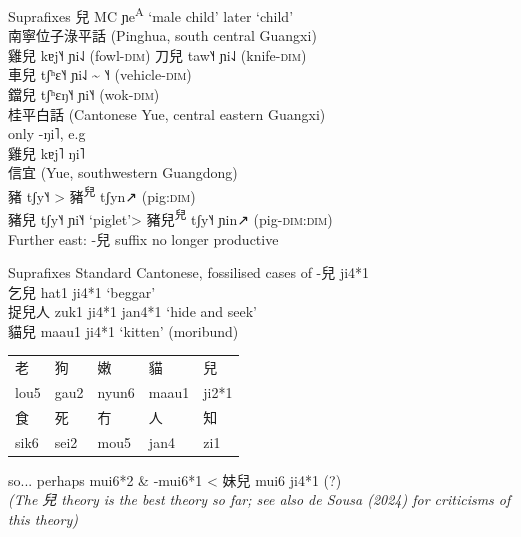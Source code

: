 \documentclass{beamer}
\begin{document}
\begin{frame}[fragile]{Suprafixes}
兒 MC ɲe\textsuperscript{A} \enquote*{male child} later \enquote*{child}\\
\bigskip
南寧位子淥平話 (Pinghua, south central Guangxi)\\
雞兒 kɐj˥˧ ɲi˨˩ (fowl-\textsc{dim})
\quad 刀兒 taw˥˧ ɲi˨˩ (knife-\textsc{dim})\\
車兒 tʃʰɛ˥˧ ɲi˨˩ \~{} ˥˧ (vehicle-\textsc{dim})\\
鐺兒 tʃʰɛŋ˥˧ ɲi˥˧ (wok-\textsc{dim})\\
\medskip
桂平白話 (Cantonese Yue, central eastern Guangxi)\\
only -ŋi˥, e.g\\
雞兒 kɐj˥ ŋi˥\\
\medskip
信宜 (Yue, southwestern Guangdong)\\
豬 tʃy˥˧ > 豬\textsuperscript{兒} tʃyn↗ (pig:\textsc{dim})\\
豬兒 tʃy˥˧ ɲi˥˧ \enquote*{piglet}> 豬兒\textsuperscript{兒} tʃy˥˧ ɲin↗ (pig-\textsc{dim}:\textsc{dim})\\
\medskip
Further east: -兒 suffix no longer productive

\end{frame}

\begin{frame}[fragile]{Suprafixes}
Standard Cantonese, fossilised cases of -兒 ji4*1\\
\medskip
乞兒 hat1 ji4*1 \enquote*{beggar}\\
捉兒人 zuk1 ji4*1 jan4*1 \enquote*{hide and seek}\\
\textcolor{gray!75}{貓兒 maau1 ji4*1 \enquote*{kitten} (moribund)}\\
\medskip
\begin{table}
    \flushleft
    \textcolor{gray!75}{
    \begin{tabular}{l l l l l}
        老 & 狗 & 嫩 & 貓 & 兒\\
        lou5 & gau2 & nyun6 & maau1 & ji2*1\\
        食 & 死 & 冇 & 人 & 知\\
        sik6 & sei2 & mou5 & jan4 & zi1\\ 
    \end{tabular}}
\end{table}
\bigskip
so... perhaps mui6*2 \& -mui6*1 < 妹兒 mui6 ji4*1 (?)\\
\smallskip
\emph{\footnotesize (The 兒 theory is the best theory so far; see also de Sousa (2024) for criticisms of this theory)}

\end{frame}
\end{document}
